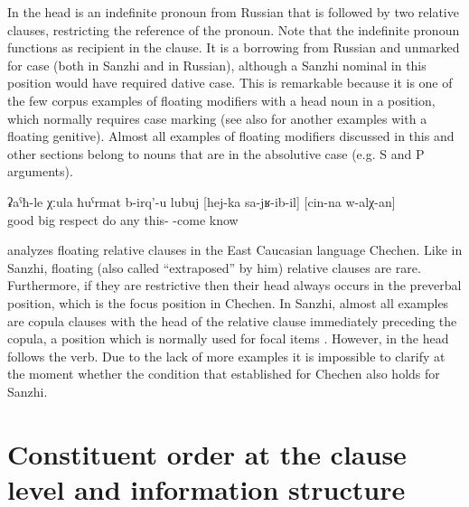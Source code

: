 In  the head is an indefinite pronoun from Russian that is followed by two relative clauses, restricting the reference of the pronoun. Note that the indefinite pronoun functions as recipient in the clause. It is a borrowing from Russian and unmarked for case (both in Sanzhi and in Russian), although a Sanzhi nominal in this position would have required dative case. This is remarkable because it is one of the few corpus examples of floating modifiers with a head noun in a position, which normally requires case marking (see also  for another examples with a floating genitive). Almost all examples of floating modifiers discussed in this and other sections belong to nouns that are in the absolutive case (e.g. S and P arguments).
%
\begin{exe}
	\ex	\label{ex:‎He gives respect to anybody who comes here, whom he knows}
	\gll	ʡaˁħ-le	χːula	ħuˁrmat	b-irq'-u	lubuj		[hej-ka	sa-jʁ-ib-il]	[cin-na	w-alχ-an]\\
		good	big	respect	do	any	this-	-come		know\\
	\glt	{}
\end{exe}

\citet{Komen2014} analyzes floating relative clauses in the East Caucasian language Chechen. Like in Sanzhi, floating (also called ``extraposed'' by him) relative clauses are rare. Furthermore, if they are restrictive then their head always occurs in the preverbal position, which is the focus position in Chechen. In Sanzhi, almost all examples are copula clauses with the head of the relative clause immediately preceding the copula, a position which is normally used for focal items . However, in  the head follows the verb. Due to the lack of more examples it is impossible to clarify at the moment whether the condition that \citet{Komen2014} established for Chechen also holds for Sanzhi.



\section{Constituent order at the clause level and information structure}
\label{sec:Constituent order at the clause level and information structure}

